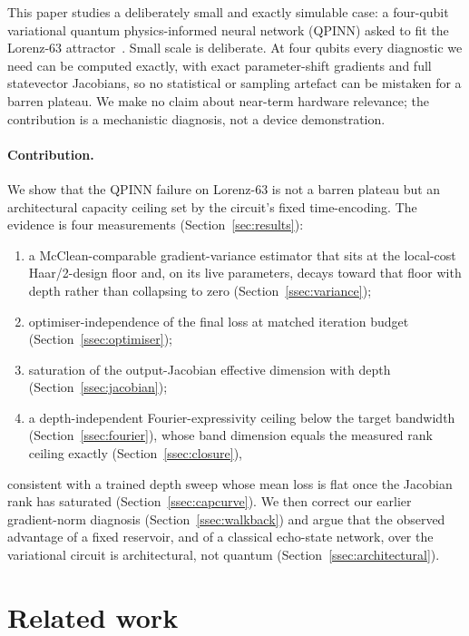 \documentclass[a4paper,12pt]{iopart}
\begin{document}
This paper studies a deliberately small and exactly simulable case: a four-qubit
variational quantum physics-informed neural network (QPINN) asked to fit the
Lorenz-63 attractor~\cite{lorenz1963,raissi2019,qcpinn2025,leung2022qpinn}.
Small scale is deliberate. At four qubits every diagnostic we need can be
computed exactly, with exact parameter-shift gradients and full statevector
Jacobians, so no statistical or sampling artefact can be mistaken for a barren
plateau. We make no claim about near-term hardware relevance; the contribution
is a mechanistic diagnosis, not a device demonstration.

\paragraph{Contribution.}
We show that the QPINN failure on Lorenz-63 is not a barren plateau but an
architectural capacity ceiling set by the circuit's fixed time-encoding. The
evidence is four measurements (Section~\ref{sec:results}):
\begin{enumerate}
  \item a McClean-comparable gradient-variance estimator that sits at the
        local-cost Haar/2-design floor and, on its live parameters, decays
        toward that floor with depth rather than collapsing to zero
        (Section~\ref{ssec:variance});
  \item optimiser-independence of the final loss at matched iteration budget
        (Section~\ref{ssec:optimiser});
  \item saturation of the output-Jacobian effective dimension with depth
        (Section~\ref{ssec:jacobian});
  \item a depth-independent Fourier-expressivity ceiling below the target
        bandwidth (Section~\ref{ssec:fourier}), whose band dimension equals
        the measured rank ceiling exactly (Section~\ref{ssec:closure}),
\end{enumerate}
consistent with a trained depth sweep whose mean loss is flat once the Jacobian
rank has saturated (Section~\ref{ssec:capcurve}). We then correct our earlier
gradient-norm diagnosis (Section~\ref{ssec:walkback}) and argue that the
observed advantage of a fixed reservoir, and of a classical echo-state network,
over the variational circuit is architectural, not quantum
(Section~\ref{ssec:architectural}).

\section{Related work}
\end{document}
